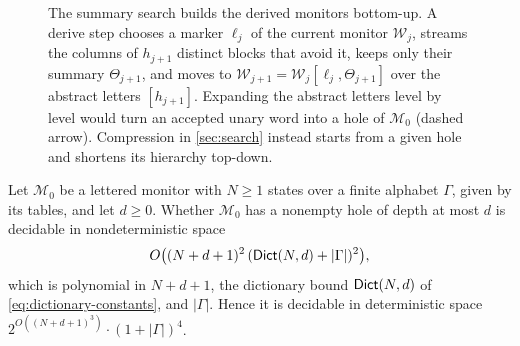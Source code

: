 \begin{figure}[tbp]
\centering
{}
\caption{The summary search builds the derived monitors bottom-up. A derive
step chooses a marker $\ell_j$ of the current monitor $\mathcal W_j$, streams
the columns of $h_{j+1}$ distinct blocks that avoid it, keeps only their
summary $\Theta_{j+1}$, and moves to
$\mathcal W_{j+1}=\mathcal W_j[\ell_j,\Theta_{j+1}]$ over the abstract
letters $[h_{j+1}]$. Expanding the abstract letters level by level would
turn an accepted unary word into a hole of $\mathcal M_0$ (dashed arrow).
Compression in \cref{sec:search} instead starts from a given hole and
shortens its hierarchy top-down.}
\label{fig:summary-levels}
\end{figure}

\begin{proposition}\label{prop:summary-search}
Let $\mathcal M_0$ be a lettered monitor with $N\ge1$ states over a finite
alphabet $\Gamma$, given by its tables, and let $d\ge0$. Whether
$\mathcal M_0$ has a nonempty hole of depth at most $d$ is decidable in
nondeterministic space
\[
 O\bigl((N+d+1)^2\,(\mathsf{Dict}(N,d)+|\Gamma|)^2\bigr),
\]
which is polynomial in $N+d+1$, the dictionary bound $\mathsf{Dict}(N,d)$ of
\eqref{eq:dictionary-constants}, and $|\Gamma|$. Hence it is decidable in
deterministic space $2^{O((N+d+1)^3)}\cdot(1+|\Gamma|)^4$.
\end{proposition}


